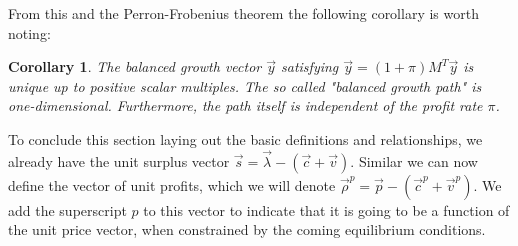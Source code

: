 \documentclass{article}
\theoremstyle{definition}
\theoremstyle{plain}
\theoremstyle{theorem}
\newtheorem{corollary}{Corollary}[section]
\begin{document}
From this and the Perron-Frobenius theorem the following corollary is worth noting:
\begin{corollary}
	The \emph{balanced growth} vector $\vec{y}$ satisfying $\vec{y} = (1+\pi)M^T\vec{y}$ is unique up to positive scalar multiples. The so called "balanced growth path" is one-dimensional.  Furthermore, the path itself is independent of the profit rate $\pi$. 
\end{corollary}
To conclude this section laying out the basic definitions and relationships, we already have the unit surplus vector $\vec{s} = \vec{\lambda} - (\vec{c}+\vec{v})$. Similar we can now define the vector of unit profits, which we will denote $\vec{\rho}^p = \vec{p} - (\vec{c}^p + \vec{v}^p)$. We add the superscript $p$ to this vector to indicate that it is going to be a function of the unit price vector, when constrained by the coming equilibrium conditions.
\end{document}

